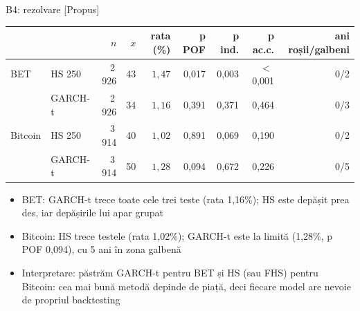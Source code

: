 \ifsolutions
\begin{frame}{B4: rezolvare [Propus]}
\itemsize{\footnotesize}
\begin{center}
\scriptsize
\begin{tabular}{llrrrrrrr}
\toprule
& & $n$ & $x$ & rata (\%) & p POF & p ind. & p ac.c. & ani roșii/galbeni \\
\midrule
BET & HS 250 & 2\,926 & 43 & $1{,}47$ & 0{,}017 & 0{,}003 & $<$\,0{,}001 & 0/2 \\
 & GARCH-t & 2\,926 & 34 & $1{,}16$ & 0{,}391 & 0{,}371 & 0{,}464 & 0/3 \\
Bitcoin & HS 250 & 3\,914 & 40 & $1{,}02$ & 0{,}891 & 0{,}069 & 0{,}190 & 0/2 \\
 & GARCH-t & 3\,914 & 50 & $1{,}28$ & 0{,}094 & 0{,}672 & 0{,}226 & 0/5 \\
\bottomrule
\end{tabular}
\end{center}
\begin{itemize}
    \item BET: GARCH-t trece toate cele trei teste (rata 1{,}16\%); HS este depășit prea des, iar depășirile lui apar grupat
    \item Bitcoin: HS trece testele (rata 1{,}02\%); GARCH-t este la limită (1{,}28\%, p POF 0{,}094), cu 5 ani în zona galbenă
    \item Interpretare: păstrăm GARCH-t pentru BET și HS (sau FHS) pentru Bitcoin: cea mai bună metodă depinde de piață, deci fiecare model are nevoie de propriul backtesting
\end{itemize}
\end{frame}
\fi

